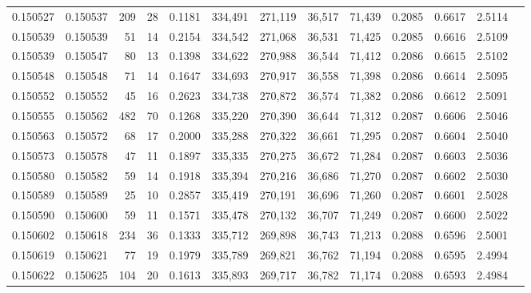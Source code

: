 \begin{tabular}{rrrrrrrrrrrrr}
0.150527 & 0.150537 &   209 &  28 &                                     0.1181 & 334,491 & 271,119 &  36,517 &  71,439 & 0.2085 & 0.6617 & 2.5114 \\
0.150539 & 0.150539 &    51 &  14 &                                     0.2154 & 334,542 & 271,068 &  36,531 &  71,425 & 0.2085 & 0.6616 & 2.5109 \\
0.150539 & 0.150547 &    80 &  13 &                                     0.1398 & 334,622 & 270,988 &  36,544 &  71,412 & 0.2086 & 0.6615 & 2.5102 \\
0.150548 & 0.150548 &    71 &  14 &                                     0.1647 & 334,693 & 270,917 &  36,558 &  71,398 & 0.2086 & 0.6614 & 2.5095 \\
0.150552 & 0.150552 &    45 &  16 &                                     0.2623 & 334,738 & 270,872 &  36,574 &  71,382 & 0.2086 & 0.6612 & 2.5091 \\
0.150555 & 0.150562 &   482 &  70 &                                     0.1268 & 335,220 & 270,390 &  36,644 &  71,312 & 0.2087 & 0.6606 & 2.5046 \\
0.150563 & 0.150572 &    68 &  17 &                                     0.2000 & 335,288 & 270,322 &  36,661 &  71,295 & 0.2087 & 0.6604 & 2.5040 \\
0.150573 & 0.150578 &    47 &  11 &                                     0.1897 & 335,335 & 270,275 &  36,672 &  71,284 & 0.2087 & 0.6603 & 2.5036 \\
0.150580 & 0.150582 &    59 &  14 &                                     0.1918 & 335,394 & 270,216 &  36,686 &  71,270 & 0.2087 & 0.6602 & 2.5030 \\
0.150589 & 0.150589 &    25 &  10 &                                     0.2857 & 335,419 & 270,191 &  36,696 &  71,260 & 0.2087 & 0.6601 & 2.5028 \\
0.150590 & 0.150600 &    59 &  11 &                                     0.1571 & 335,478 & 270,132 &  36,707 &  71,249 & 0.2087 & 0.6600 & 2.5022 \\
0.150602 & 0.150618 &   234 &  36 &                                     0.1333 & 335,712 & 269,898 &  36,743 &  71,213 & 0.2088 & 0.6596 & 2.5001 \\
0.150619 & 0.150621 &    77 &  19 &                                     0.1979 & 335,789 & 269,821 &  36,762 &  71,194 & 0.2088 & 0.6595 & 2.4994 \\
0.150622 & 0.150625 &   104 &  20 &                                     0.1613 & 335,893 & 269,717 &  36,782 &  71,174 & 0.2088 & 0.6593 & 2.4984 \\

\end{tabular}
